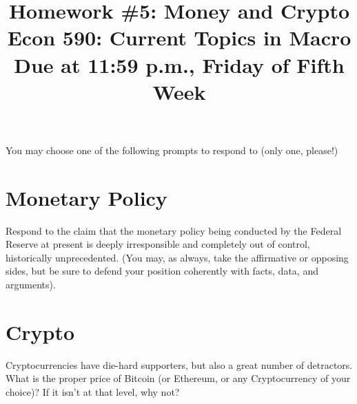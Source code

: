 \documentclass[a4paper]{article}
\title{{\Large \bf Homework \#5: Money and Crypto} \\ \small Econ 590: Current Topics in Macro \\ \small Due at  11:59 p.m., Friday of Fifth Week}
\date{}
\begin{document}
\maketitle
 
\noindent
You may choose one of the following prompts to respond to (only one, please!)

\section*{Monetary Policy}
Respond to the claim that the monetary policy being conducted by the Federal Reserve at present is deeply irresponsible and completely out of control, historically unprecedented.  (You may, as always, take the affirmative or opposing sides, but be sure to defend your position coherently with facts, data, and arguments).

\section*{Crypto}
Cryptocurrencies have die-hard supporters, but also a great number of detractors.  What is the proper price of Bitcoin (or Ethereum, or any Cryptocurrency of your choice)?  If it isn't at that level, why not?  
\end{document}
